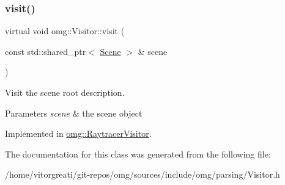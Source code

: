 \subsubsection{\texorpdfstring{visit()}{visit()}}
{\footnotesize\ttfamily virtual void omg\+::\+Visitor\+::visit (\begin{DoxyParamCaption}\item[{const std\+::shared\+\_\+ptr$<$ \mbox{\hyperlink{classomg_1_1_scene}{Scene}} $>$ \&}]{scene }\end{DoxyParamCaption})\hspace{0.3cm}{\ttfamily [pure virtual]}}



Visit the scene root description. 


\begin{DoxyParams}{Parameters}
{\em scene} & the scene object \\
\hline
\end{DoxyParams}


Implemented in \mbox{\hyperlink{classomg_1_1_raytracer_visitor_ac469c21e8ac5e9a01ca6a58108bc860e}{omg\+::\+Raytracer\+Visitor}}.



The documentation for this class was generated from the following file\+:\begin{DoxyCompactItemize}
\item 
/home/vitorgreati/git-\/repos/omg/sources/include/omg/parsing/Visitor.\+h\end{DoxyCompactItemize}
